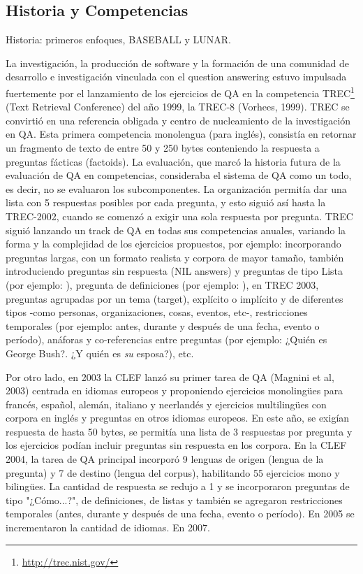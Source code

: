 \subsection{Historia y Competencias}
\label{subsec:historia}
\label{subsec:competencias}
{\color{red}Historia: primeros enfoques, BASEBALL y LUNAR.}

La investigación, la producción de software y la formación de una comunidad de desarrollo e investigación vinculada con el question answering estuvo impulsada fuertemente por el lanzamiento de los ejercicios de QA en la competencia TREC\footnote{\url{http://trec.nist.gov/}} (Text Retrieval Conference) del año 1999, la TREC-8 (Vorhees, 1999). TREC se convirtió en una referencia obligada y centro de nucleamiento de la investigación en QA. Esta primera competencia monolengua (para inglés), consistía en retornar un fragmento de texto de entre 50 y 250 bytes conteniendo la respuesta a preguntas fácticas (factoids). La evaluación, que marcó la historia futura de la evaluación de QA en competencias, consideraba el sistema de QA como un todo, es decir, no se evaluaron los subcomponentes. La organización permitía dar una lista con 5 respuestas posibles por cada pregunta, y esto siguió así hasta la TREC-2002, cuando se comenzó a exigir una sola respuesta por pregunta. TREC siguió lanzando un track de QA en todas sus competencias anuales, variando la forma y la complejidad de los ejercicios propuestos, por ejemplo: incorporando preguntas largas, con un formato realista y corpora de mayor tamaño, también introduciendo preguntas sin respuesta (NIL answers) y preguntas de tipo Lista (por ejemplo: ), pregunta de definiciones (por ejemplo: ), en TREC 2003, preguntas agrupadas por un tema (target), explícito o implícito y de diferentes tipos -como personas, organizaciones, cosas, eventos, etc-, restricciones temporales (por ejemplo: antes, durante y después de una fecha, evento o período), anáforas y co-referencias entre preguntas (por ejemplo: ¿Quién es George Bush?. ¿Y quién es \textit{su} esposa?), etc.

Por otro lado, en 2003 la CLEF lanzó su primer tarea de QA (Magnini et al, 2003) centrada en idiomas europeos y proponiendo ejercicios monolingües para francés, español, alemán, italiano y neerlandés y ejercicios multilingües con corpora en inglés y preguntas en otros idiomas europeos. En este año, se exigían respuesta de hasta 50 bytes, se permitía una lista de 3 respuestas por pregunta y los ejercicios podían incluir preguntas sin respuesta en los corpora. En la CLEF 2004, la tarea de QA principal incorporó 9 lenguas de origen (lengua de la pregunta) y 7 de destino (lengua del corpus), habilitando 55 ejercicios mono y bilingües. La cantidad de respuesta se redujo a 1 y se incorporaron preguntas de tipo "¿Cómo...?", de definiciones, de listas y también se agregaron restricciones temporales (antes, durante y después de una fecha, evento o período). En 2005 se incrementaron la cantidad de idiomas. En 2007.

